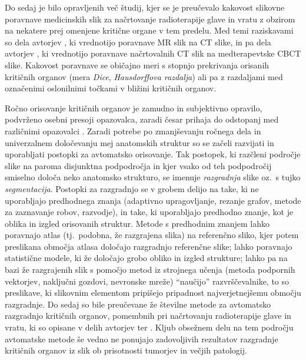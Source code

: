 \documentclass[a4paper,twoside,11pt]{article}
\begin{document}
	\par{
	  Do sedaj je bilo opravljenih več študij, kjer se je preučevalo kakovost slikovne poravnave medicinskih slik za načrtovanje radioterapije glave in vratu z obzirom na nekatere prej omenjene kritične organe v tem predelu. Med temi raziskavami so dela avtorjev \cite{webster2009,sohn2008,castadot2008,duboisdaische2007,brouwer2014,leibfarth2013,fortunati2014}, ki vrednotijo poravnave MR slik na CT slike, in pa dela avtorjev \cite{hou2011,mencarelli2014,veiga2014}, ki vrednotijo poravnave načrtovalnih CT slik na medterapevtske CBCT slike. Kakovost poravnave se običajno meri s stopnjo prekrivanja orisanih kritičnih organov (mera \emph{Dice}, \emph{Hausdorffova razdalja}) ali pa z razdaljami med označenimi oslonilnimi točkami v bližini kritičnih organov.
	}
	\par{
	  Ročno orisovanje kritičnih organov je zamudno \citep{harari2010} in subjektivno opravilo, podvrženo osebni presoji opazovalca, zaradi česar prihaja do odstopanj med različnimi opazovalci \citep{brouwer2012}.  Zaradi potrebe po zmanjševanju ročnega dela in univerzalnem določevanju mej anatomskih struktur so se začeli razvijati in uporabljati postopki za avtomatsko orisovanje. Tak postopek, ki razčleni področje slike na paroma disjunktna podpodročja in kjer vsako od teh podpodročij smiselno določa neko anatomsko strukturo, se imenuje \emph{razgradnja} slike oz.~s tujko \emph{segmentacija}. Postopki za razgradnjo se v grobem delijo na take, ki ne uporabljajo predhodnega znanja (adaptivno upragovljanje, rezanje grafov, metode za zaznavanje robov, razvodje), in take, ki uporabljajo predhodno znanje, kot je oblika in izgled orisovanih struktur. Metode s predhodnim znanjem lahko poravnajo atlas (tj.~podobna, že razgrajena slika) na referenčno sliko, kjer potem preslikana območja atlasa določajo razgradnjo referenčne slike; lahko poravnajo statistične modele, ki že določajo grobo obliko in izgled strukture; lahko pa na bazi že razgrajenih slik s pomočjo metod iz strojnega učenja (metoda podpornih vektorjev, naključni gozdovi, nevronske mreže) ``naučijo'' razvrščevalnike, to so preslikave, ki slikovnim elementom pripišejo pripadnost najverjetnejšemu območju razgradnje. Do sedaj so bile preučevane že številne metode za avtomatsko razgradnjo kritičnih organov, pomembnih pri načrtovanju radioterapije glave in vratu, ki so opisane v delih avtorjev \cite{han2008, commowick2008, voet2011, daisne2013, bondiau2005, isambert2008, sims2009, fritscher2014, teguh2011, fortunati2013, verhaart2014, wachinger2015, hoangduc2015, fortunati2015, chen2010, teng2010, yang2014, qazi2011, commowick2008a, deeley2011, leavens2008, ibragimov2015, yan2004, dornheim2007, bekes2008, gorthi2009, faggiano2011, mattiucci2013, verhaart2014a, thariat2012, peroni2012, lamacchia2012, thomson2014, chen2012, tao2015, stapleford2010, ibragimov2017} ter \cite{zhang2007}. Kljub obsežnem delu na tem področju avtomatske metode še vedno ne ponujajo zadovoljivih rezultatov razgradnje kritičnih organov iz slik ob prisotnosti tumorjev in večjih patologij.
	}
	  
\end{document}
